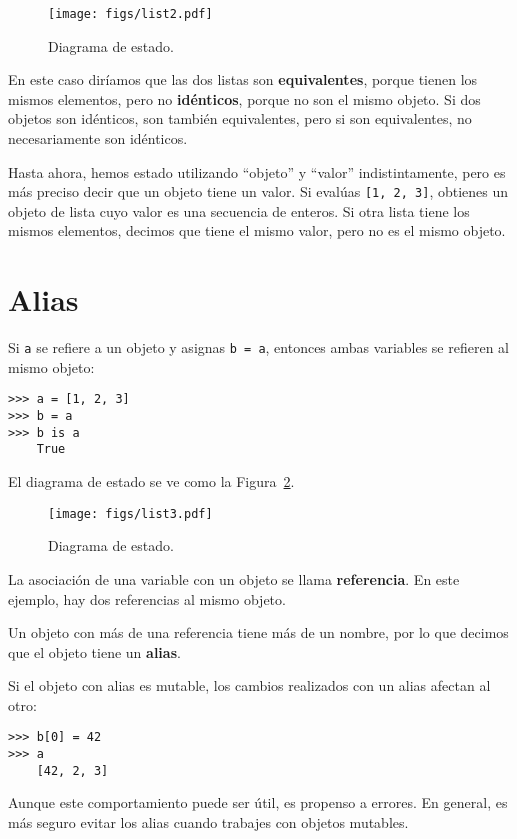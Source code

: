 \documentclass[10pt]{book}
\begin{document}
\begin{figure}
\centerline
{\texttt{[image: figs/list2.pdf]}}
\caption{Diagrama de estado.}
\label{fig.list2}
\end{figure}

En este caso diríamos que las dos listas son {\bf equivalentes},
porque tienen los mismos elementos, pero no {\bf idénticos}, porque
no son el mismo objeto.  Si dos objetos son idénticos, son
también equivalentes, pero si son equivalentes, no necesariamente son
idénticos.

Hasta ahora, hemos estado utilizando ``objeto'' y ``valor''
indistintamente, pero es más preciso decir que un objeto tiene un
valor.  Si evalúas {\tt [1, 2, 3]}, obtienes un objeto de
lista cuyo valor es una secuencia de enteros.  Si otra
lista tiene los mismos elementos, decimos que tiene el mismo valor, pero
no es el mismo objeto.


\section{Alias}

Si {\tt a} se refiere a un objeto y asignas {\tt b = a},
entonces ambas variables se refieren al mismo objeto:

\begin{verbatim}
>>> a = [1, 2, 3]
>>> b = a
>>> b is a
    True
\end{verbatim}
%
El diagrama de estado se ve como la Figura~\ref{fig.list3}.

\begin{figure}
\centerline
{\texttt{[image: figs/list3.pdf]}}
\caption{Diagrama de estado.}
\label{fig.list3}
\end{figure}

La asociación de una variable con un objeto se llama {\bf
referencia}.  En este ejemplo, hay dos referencias al mismo
objeto.

Un objeto con más de una referencia tiene más
de un nombre, por lo que decimos que el objeto tiene un {\bf alias}.

Si el objeto con alias es mutable, los cambios realizados con un alias afectan
al otro:

\begin{verbatim}
>>> b[0] = 42
>>> a
    [42, 2, 3]
\end{verbatim}
%
Aunque este comportamiento puede ser útil, es propenso a errores.  En general,
es más seguro evitar los alias cuando trabajes con objetos
mutables.
\end{document}
